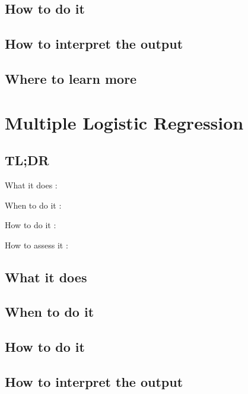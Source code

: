 \documentclass[
]{book}
\begin{document}
\hypertarget{how-to-do-it-2}{%
\section{How to do it}\label{how-to-do-it-2}}

\hypertarget{how-to-interpret-the-output-2}{%
\section{How to interpret the output}\label{how-to-interpret-the-output-2}}

\hypertarget{where-to-learn-more-2}{%
\section{Where to learn more}\label{where-to-learn-more-2}}

\hypertarget{multiple-logistic-regression}{%
\chapter{Multiple Logistic Regression}\label{multiple-logistic-regression}}

\hypertarget{tldr-3}{%
\section{TL;DR}\label{tldr-3}}

What it does
:

When to do it
:

How to do it
:

How to assess it
:

\hypertarget{what-it-does-3}{%
\section{What it does}\label{what-it-does-3}}

\hypertarget{when-to-do-it-3}{%
\section{When to do it}\label{when-to-do-it-3}}

\hypertarget{how-to-do-it-3}{%
\section{How to do it}\label{how-to-do-it-3}}

\hypertarget{how-to-interpret-the-output-3}{%
\section{How to interpret the output}\label{how-to-interpret-the-output-3}}
\end{document}
